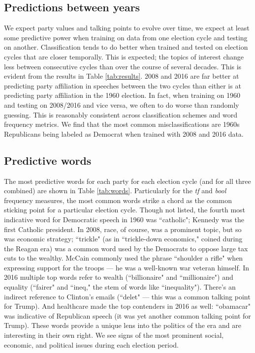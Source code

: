 \documentclass[aps, prl, reprint, showpacs]{revtex4-1}
\begin{document}
\subsection{Predictions between years}
We expect party values and talking points to evolve over time, we expect at least some predictive power when training on data from one election cycle and testing on another. Classification tends to do better when trained and tested on election cycles that are closer temporally. This is expected; the topics of interest change less between consecutive cycles than over the course of several decades. This is evident from the results in Table \ref{tab:results}. 2008 and 2016 are far better at predicting party affiliation in speeches between the two cycles than either is at predicting party affiliation in the 1960 election. In fact, when training on 1960 and testing on 2008/2016 and vice versa, we often to do worse than randomly guessing. This is reasonably consistent across classification schemes and word frequency metrics. We find that the most common misclassifications are 1960s Republicans being labeled as Democrat when trained with 2008 and 2016 data.

\subsection{Predictive words}

The most predictive words for each party for each election cycle (and for all three combined) are shown in Table \ref{tab:words}. Particularly for the \textit{tf} and \textit{bool} frequency measures, the most common words strike a chord as the common sticking point for a particular election cycle. Though not listed, the fourth most indicative word for Democratic speech in 1960 was ``catholic"; Kennedy was the first Catholic president. In 2008, race, of course, was a prominent topic, but so was economic strategy; ``trickle" (as in ``trickle-down economics," coined during the Reagan era) was a common word used by the Democrats to oppose large tax cuts to the wealthy. McCain commonly used the phrase ``shoulder a rifle" when expressing support for the troops --- he was a well-known war veteran himself. In 2016 multiple top words refer to wealth (``billionaire" and ``millionaire") and equality (``fairer" and ``ineq," the stem of words like ``inequality"). There's an indirect reference to Clinton's emails (``delet" --- this was a common talking point for Trump). And healthcare made the top contenders in 2016 as well: ``obamacar" was indicative of Republican speech (it was yet another common talking point for Trump). These words provide a unique lens into the politics of the era and are interesting in their own right. We see signs of the most prominent social, economic, and political issues during each election period.
\end{document}
